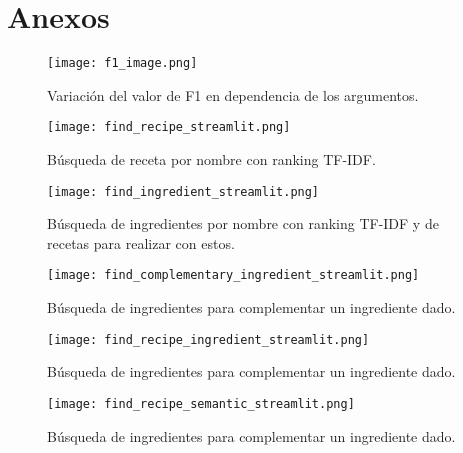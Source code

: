 \documentclass[
	a4paper, %
	10pt, %
	unnumberedsections, %
	twoside, %
]{LTJournalArticle}
\begin{document}

\printbibliography %



\section{Anexos}

\newpage

\begin{figure}
	\texttt{[image: f1\_image.png]}
	\caption{Variación del valor de F1 en dependencia de los argumentos.}
	\label{fig:f1_plot}
\end{figure}

\begin{figure}
	\texttt{[image: find\_recipe\_streamlit.png]}
	\caption{Búsqueda de receta por nombre con ranking TF-IDF.}
	\label{fig:recipe_search_tfidf}
\end{figure}

\begin{figure}
	\texttt{[image: find\_ingredient\_streamlit.png]}
	\caption{Búsqueda de ingredientes por nombre con ranking TF-IDF y de recetas para realizar con estos.}
	\label{fig:ingredient_search_tfidf}
\end{figure}

\begin{figure}
	\texttt{[image: find\_complementary\_ingredient\_streamlit.png]}
	\caption{Búsqueda de ingredientes para complementar un ingrediente dado.}
	\label{fig:complementary_ingredient_search_tfidf}
\end{figure}

\begin{figure}
	\texttt{[image: find\_recipe\_ingredient\_streamlit.png]}
	\caption{Búsqueda de ingredientes para complementar un ingrediente dado.}
	\label{fig:recipe_ingredient_tfidf}
\end{figure}

\begin{figure}
	\texttt{[image: find\_recipe\_semantic\_streamlit.png]}
	\caption{Búsqueda de ingredientes para complementar un ingrediente dado.}
	\label{fig:recipe_semantic_tfidf}
\end{figure}
\end{document}
